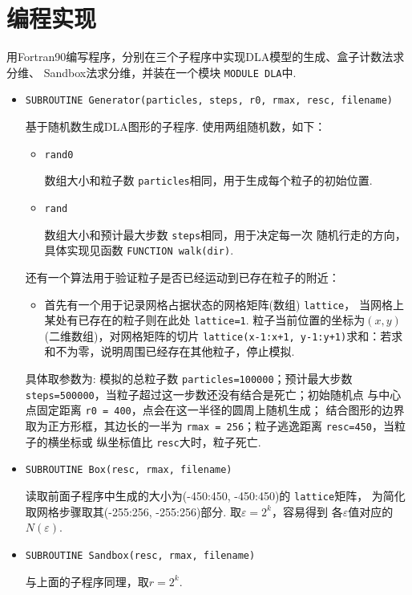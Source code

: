 \documentclass[12pt,a4paper,utf8]{ctexart}
\begin{document}
\section{编程实现}

用Fortran90编写程序，分别在三个子程序中实现DLA模型的生成、盒子计数法求分维、
Sandbox法求分维，并装在一个模块 \texttt{MODULE DLA}中. 

\begin{itemize}
    \item \texttt{SUBROUTINE Generator(particles, steps, r0, rmax, resc,
        filename)}

        基于随机数生成DLA图形的子程序.
        使用两组随机数，如下：
        \begin{itemize}
            \item \texttt{rand0} 

                数组大小和粒子数
                \texttt{particles}相同，用于生成每个粒子的初始位置.
            \item \texttt{rand}

                数组大小和预计最大步数 \texttt{steps}相同，用于决定每一次
                随机行走的方向，具体实现见函数 \texttt{FUNCTION walk(dir)}.
        \end{itemize}
        还有一个算法用于验证粒子是否已经运动到已存在粒子的附近：
        \begin{itemize}
            \item 首先有一个用于记录网格占据状态的网格矩阵(数组) \texttt{lattice}，
                当网格上某处有已存在的粒子则在此处 \texttt{lattice=1}.
                粒子当前位置的坐标为$(x, y)$(二维数组)，对网格矩阵的切片 
                \texttt{lattice(x-1:x+1,
                y-1:y+1)}求和：若求和不为零，说明周围已经存在其他粒子，停止模拟.
        \end{itemize}
    具体取参数为: 模拟的总粒子数 \texttt{particles=100000}；预计最大步数
    \texttt{steps=500000}，当粒子超过这一步数还没有结合是死亡；初始随机点
    与中心点固定距离 \texttt{r0 = 400}，点会在这一半径的圆周上随机生成；
    结合图形的边界取为正方形框，其边长的一半为
    \texttt{rmax = 256}；粒子逃逸距离 \texttt{resc=450}，当粒子的横坐标或
    纵坐标值比 \texttt{resc}大时，粒子死亡.
    
\item \texttt{SUBROUTINE Box(resc, rmax, filename)}

    读取前面子程序中生成的大小为(-450:450, -450:450)的 \texttt{lattice}矩阵，
    为简化取网格步骤取其(-255:256, -255:256)部分. 取$\varepsilon=2^k$，容易得到
    各$\varepsilon$值对应的$N(\varepsilon)$.

\item \texttt{SUBROUTINE Sandbox(resc, rmax, filename)}

    与上面的子程序同理，取$r=2^k$.
\end{itemize}
\end{document}

